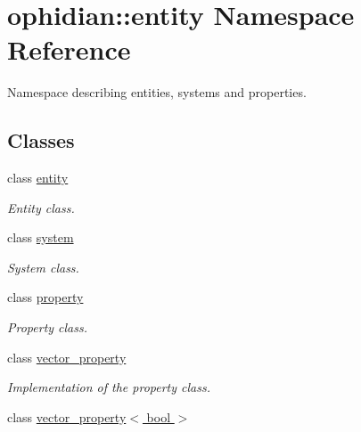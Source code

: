 \hypertarget{namespaceophidian_1_1entity}{\section{ophidian\-:\-:entity Namespace Reference}
\label{namespaceophidian_1_1entity}
}


Namespace describing entities, systems and properties.  


\subsection*{Classes}
\begin{DoxyCompactItemize}
\item 
class \hyperlink{classophidian_1_1entity_1_1entity}{entity}
\begin{DoxyCompactList}\small\item\em Entity class. \end{DoxyCompactList}\item 
class \hyperlink{classophidian_1_1entity_1_1system}{system}
\begin{DoxyCompactList}\small\item\em System class. \end{DoxyCompactList}\item 
class \hyperlink{classophidian_1_1entity_1_1property}{property}
\begin{DoxyCompactList}\small\item\em Property class. \end{DoxyCompactList}\item 
class \hyperlink{classophidian_1_1entity_1_1vector__property}{vector\-\_\-property}
\begin{DoxyCompactList}\small\item\em Implementation of the property class. \end{DoxyCompactList}\item 
class \hyperlink{classophidian_1_1entity_1_1vector__property_3_01bool_01_4}{vector\-\_\-property$<$ bool $>$}
\end{DoxyCompactItemize}
